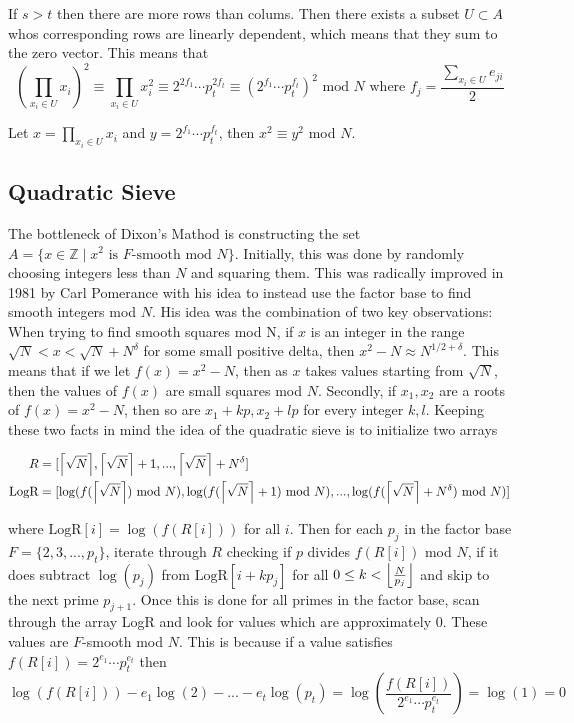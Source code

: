 \documentclass[10pt,a4paper]{article}
\theoremstyle{plain}
\theoremstyle{definition}
\theoremstyle{remark}
\newcommand{\Z}{\mathbb{Z}}
\DeclarePairedDelimiter\ceil{\lceil}{\rceil}
\DeclarePairedDelimiter\floor{\lfloor}{\rfloor}
\begin{document}
  If $s>t$ then there are more rows than colums. Then there exists a subset $U \subset A$ whos corresponding rows are linearly dependent, which means that they sum to the zero vector. This means that 
  $$
  (\prod_{x_i \in U}x_i)^2 \equiv \prod_{x_i \in U}x_i^2 \equiv 2^{2f_1} \cdots p_t^{2f_t} \equiv (2^{f_1} \cdots p_t^{f_t})^2 \text{ mod } N \text{ where } f_j = \frac{\sum_{x_i \in U} e_{ji}}{2} 
  $$

  Let $x= \prod_{x_i \in U}x_i $ and $y = 2^{f_1} \cdots p_t^{f_t}$, then $x^2 \equiv y^2$ mod $N$. 

\subsection{Quadratic Sieve}
  The bottleneck of Dixon's Mathod is constructing the set $A = \lbrace x \in \Z \mid x^2 \text{ is }F\text{-smooth mod } N \rbrace$. Initially, this was done by randomly choosing integers less than $N$ and squaring them. This was radically improved in 1981 by Carl Pomerance with his idea to instead use the factor base to find smooth integers mod $N$. His idea was the combination of two key observations: When trying to find smooth squares mod N, if $x$ is an integer in the range $\sqrt{N} < x < \sqrt{N} + N^\delta $ for some small positive delta, then $x^2 - N \approx N^{1/2 + \delta}$. This means that if we let $f(x) = x^2 - N $, then as $x$ takes values starting from $\sqrt{N}$, then the values of $f(x)$ are small squares mod $N$. Secondly, if $x_1,x_2$ are a roots of $f(x)= x^2 - N$, then so are $x_1 + kp,x_2 + lp$ for every integer $k,l$. Keeping these two facts in mind the idea of the quadratic sieve is to initialize two arrays

  \begin{align*}
    R &= [\ceil*{{\sqrt{N}}},\ceil*{{\sqrt{N}}}+ 1, ..., \ceil*{\sqrt{N}} + N^\delta] \\
    \text{LogR} &= [\log(f(\ceil*{\sqrt{N}}) \text{ mod } N), \log(f(\ceil*{\sqrt{N}}+1) \text{ mod } N),..., \log(f(\ceil*{\sqrt{N}}  + N^\delta) \text{ mod } N)] 
  \end{align*}

  where $\text{LogR}[i] = \log(f(R[i]))$ for all $i$. Then for each $p_j$ in the factor base $F = \lbrace 2,3,...,p_t \rbrace $, iterate through $R$ checking if $p$ divides $f(R[i])$ mod $N$, if it does subtract $\log(p_j)$ from $\text{LogR}[i + kp_j]$ for all $0 \leq k < \floor*{\frac{N}{p_j}}$ and skip to the next prime $p_{j+1}$. Once this is done for all primes in the factor base, scan through the array LogR and look for values which are approximately $0$. These values are $F$-smooth mod $N$. This is because if a value satisfies $f(R[i]) = 2^{e_1} \cdots p_t^{e_t}$ then 
  $$ 
    \log(f(R[i])) - e_1\log(2) - ... - e_t \log(p_t) = \log(\frac{f(R[i])}{2^{e_1} \cdots p_t^{e_t}}) = \log(1) = 0
  $$
\end{document}
